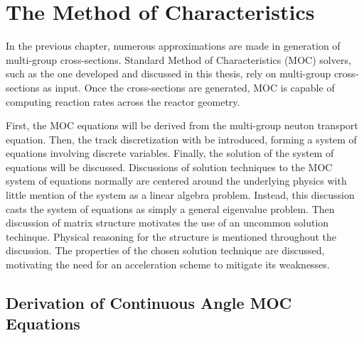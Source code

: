 \chapter{The Method of Characteristics}
\label{chap:moc}

In the previous chapter, numerous approximations are made in generation of multi-group cross-sections. Standard Method of Characteristics (MOC) solvers, such as the one developed and discussed in this thesis, rely on multi-group cross-sections as input. Once the cross-sections are generated, MOC is capable of computing reaction rates across the reactor geometry.

First, the MOC equations will be derived from the multi-group neuton transport equation. Then, the track discretization with be introduced, forming a system of equations involving discrete variables. Finally, the solution of the system of equations will be discussed. Discussions of solution techniques to the MOC system of equations normally are centered around the underlying physics with little mention of the system as a linear algebra problem. Instead, this discussion casts the system of equations as simply a general eigenvalue problem. Then discussion of matrix structure motivates the use of an uncommon solution techinque. Physical reasoning for the structure is mentioned throughout the discussion. The properties of the chosen solution technique are discussed, motivating the need for an acceleration scheme to mitigate its weaknesses.


\section{Derivation of Continuous Angle MOC Equations}
\label{sec:chap3-mc-overview}

